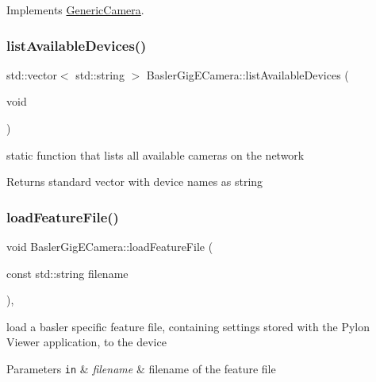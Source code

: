 Implements \hyperlink{class_generic_camera_ad050957bbb8003fc55f4656d43347f1e}{Generic\+Camera}.

\mbox{\label{class_basler_gig_e_camera_ad5460ff8176dd5ad111d5b9d11753ab0}} 
\subsubsection{\texorpdfstring{list\+Available\+Devices()}{listAvailableDevices()}}
{\footnotesize\ttfamily std\+::vector$<$ std\+::string $>$ Basler\+Gig\+E\+Camera\+::list\+Available\+Devices (\begin{DoxyParamCaption}\item[{void}]{ }\end{DoxyParamCaption})\hspace{0.3cm}{\ttfamily [static]}}

static function that lists all available cameras on the network \begin{DoxyReturn}{Returns}
standard vector with device names as string 
\end{DoxyReturn}
\mbox{\label{class_basler_gig_e_camera_aa7e8cde9ecc7b2375146f41a6e35840e}} 
\subsubsection{\texorpdfstring{load\+Feature\+File()}{loadFeatureFile()}}
{\footnotesize\ttfamily void Basler\+Gig\+E\+Camera\+::load\+Feature\+File (\begin{DoxyParamCaption}\item[{const std\+::string}]{filename }\end{DoxyParamCaption})\hspace{0.3cm}{\ttfamily [override]}, {\ttfamily [virtual]}}

load a basler specific feature file, containing settings stored with the Pylon Viewer application, to the device 
\begin{DoxyParams}[1]{Parameters}
\mbox{\tt in}  & {\em filename} & filename of the feature file \\
\hline
\end{DoxyParams}


